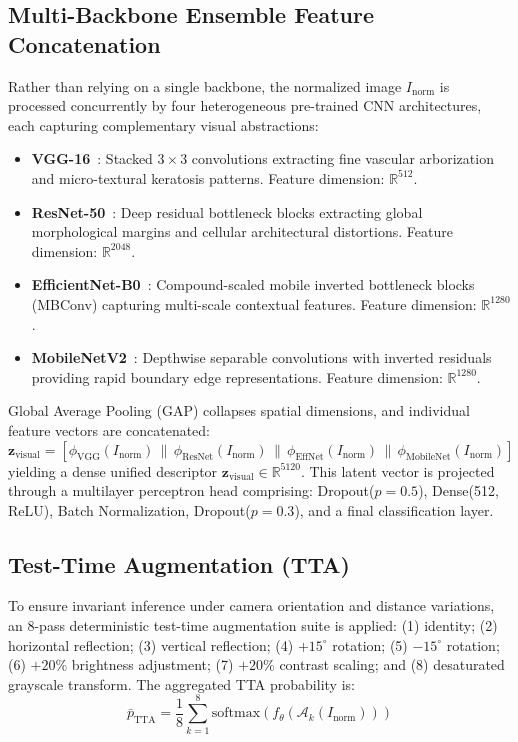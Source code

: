 \documentclass[journal]{IEEEtran}
\begin{document}
\subsection{Multi-Backbone Ensemble Feature Concatenation}
Rather than relying on a single backbone, the normalized image $I_{\text{norm}}$ is processed concurrently by four heterogeneous pre-trained CNN architectures, each capturing complementary visual abstractions:
\begin{itemize}
    \item \textbf{VGG-16}~\cite{simonyan2015very}: Stacked $3\times3$ convolutions extracting fine vascular arborization and micro-textural keratosis patterns. Feature dimension: $\mathbb{R}^{512}$.
    \item \textbf{ResNet-50}~\cite{he2016resnet}: Deep residual bottleneck blocks extracting global morphological margins and cellular architectural distortions. Feature dimension: $\mathbb{R}^{2048}$.
    \item \textbf{EfficientNet-B0}~\cite{tan2019efficientnet}: Compound-scaled mobile inverted bottleneck blocks (MBConv) capturing multi-scale contextual features. Feature dimension: $\mathbb{R}^{1280}$.
    \item \textbf{MobileNetV2}~\cite{sandler2018mobilenetv2}: Depthwise separable convolutions with inverted residuals providing rapid boundary edge representations. Feature dimension: $\mathbb{R}^{1280}$.
\end{itemize}
Global Average Pooling (GAP) collapses spatial dimensions, and individual feature vectors are concatenated:
\begin{equation}
\mathbf{z}_{\text{visual}} = \left[ \phi_{\text{VGG}}(I_{\text{norm}}) \,\|\, \phi_{\text{ResNet}}(I_{\text{norm}}) \,\|\, \phi_{\text{EffNet}}(I_{\text{norm}}) \,\|\, \phi_{\text{MobileNet}}(I_{\text{norm}}) \right]
\end{equation}
yielding a dense unified descriptor $\mathbf{z}_{\text{visual}} \in \mathbb{R}^{5120}$. This latent vector is projected through a multilayer perceptron head comprising: Dropout($p=0.5$), Dense(512, ReLU), Batch Normalization, Dropout($p=0.3$), and a final classification layer.

\subsection{Test-Time Augmentation (TTA)}
To ensure invariant inference under camera orientation and distance variations, an 8-pass deterministic test-time augmentation suite is applied: (1) identity; (2) horizontal reflection; (3) vertical reflection; (4) $+15^\circ$ rotation; (5) $-15^\circ$ rotation; (6) $+20\%$ brightness adjustment; (7) $+20\%$ contrast scaling; and (8) desaturated grayscale transform. The aggregated TTA probability is:
\begin{equation}
\bar{p}_{\text{TTA}} = \frac{1}{8} \sum_{k=1}^{8} \text{softmax}\left( f_\theta\left(\mathcal{A}_k(I_{\text{norm}})\right) \right)
\label{eq:tta}
\end{equation}
\end{document}
